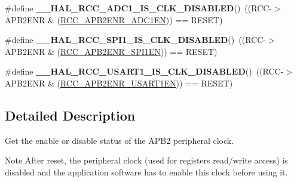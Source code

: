 \begin{DoxyCompactItemize}
\item 
\hypertarget{group___r_c_c___a_p_b2___peripheral___clock___enable___disable___status_gac9f006a3c1b75c06270f0ae5a2c3ed07}{\#define {\bfseries \-\_\-\-\_\-\-H\-A\-L\-\_\-\-R\-C\-C\-\_\-\-A\-D\-C1\-\_\-\-I\-S\-\_\-\-C\-L\-K\-\_\-\-D\-I\-S\-A\-B\-L\-E\-D}()~((R\-C\-C-\/$>$A\-P\-B2\-E\-N\-R \& (\hyperlink{group___peripheral___registers___bits___definition_ga57b9f50cb96a2e4ceba37728b4a32a42}{R\-C\-C\-\_\-\-A\-P\-B2\-E\-N\-R\-\_\-\-A\-D\-C1\-E\-N})) == R\-E\-S\-E\-T)}\label{group___r_c_c___a_p_b2___peripheral___clock___enable___disable___status_gac9f006a3c1b75c06270f0ae5a2c3ed07}

\item 
\hypertarget{group___r_c_c___a_p_b2___peripheral___clock___enable___disable___status_gabd506be27916f029d2214e88bc48f6df}{\#define {\bfseries \-\_\-\-\_\-\-H\-A\-L\-\_\-\-R\-C\-C\-\_\-\-S\-P\-I1\-\_\-\-I\-S\-\_\-\-C\-L\-K\-\_\-\-D\-I\-S\-A\-B\-L\-E\-D}()~((R\-C\-C-\/$>$A\-P\-B2\-E\-N\-R \& (\hyperlink{group___peripheral___registers___bits___definition_gae08a3510371b9234eb96369c91d3552f}{R\-C\-C\-\_\-\-A\-P\-B2\-E\-N\-R\-\_\-\-S\-P\-I1\-E\-N})) == R\-E\-S\-E\-T)}\label{group___r_c_c___a_p_b2___peripheral___clock___enable___disable___status_gabd506be27916f029d2214e88bc48f6df}

\item 
\hypertarget{group___r_c_c___a_p_b2___peripheral___clock___enable___disable___status_ga22c9d59ac6062298a71eed0d6a4a9afd}{\#define {\bfseries \-\_\-\-\_\-\-H\-A\-L\-\_\-\-R\-C\-C\-\_\-\-U\-S\-A\-R\-T1\-\_\-\-I\-S\-\_\-\-C\-L\-K\-\_\-\-D\-I\-S\-A\-B\-L\-E\-D}()~((R\-C\-C-\/$>$A\-P\-B2\-E\-N\-R \& (\hyperlink{group___peripheral___registers___bits___definition_ga4666bb90842e8134b32e6a34a0f165f3}{R\-C\-C\-\_\-\-A\-P\-B2\-E\-N\-R\-\_\-\-U\-S\-A\-R\-T1\-E\-N})) == R\-E\-S\-E\-T)}\label{group___r_c_c___a_p_b2___peripheral___clock___enable___disable___status_ga22c9d59ac6062298a71eed0d6a4a9afd}

\end{DoxyCompactItemize}


\subsection{Detailed Description}
Get the enable or disable status of the A\-P\-B2 peripheral clock. \begin{DoxyNote}{Note}
After reset, the peripheral clock (used for registers read/write access) is disabled and the application software has to enable this clock before using it. 
\end{DoxyNote}
